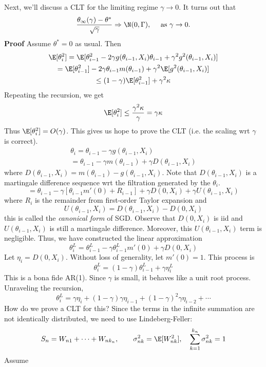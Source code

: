 Next, we'll discuss a CLT for the limiting regime \(\gamma \to 0\). It turns out that
\[\frac{\theta_\infty(\gamma) - \theta^*}{\sqrt \gamma} \Rightarrow \N(0, \Gamma), \quad \text{ as } \gamma \to 0.\]
\textbf{Proof}
Assume \(\theta^* = 0\) as usual. Then
\[\begin{gathered}\E[\theta_i^2] = \E[\theta_{i-1}^2 - 2\gamma g(\theta_{i-1}, X_i)\theta_{i-1} + \gamma^2 g^2(\theta_{i-1}, X_i)] \\
= \E[\theta_{i-1}^2] - 2 \gamma \theta_{i-1}m(\theta_{i-1}) + \gamma^2 \E[g^2(\theta_{i-1}, X_i)] \\
\leq (1 - \gamma)\E[\theta_{i-1}^2] + \gamma^2 \kappa\end{gathered}\]
Repeating the recursion, we get
\[\E[\theta_i^2] \leq \frac{\gamma^2 \kappa}{\gamma} = \gamma \kappa\]
Thus \(\E[\theta_i^2] = O(\gamma)\). This gives us hope to prove the CLT (i.e. the scaling wrt \(\gamma\) is correct).
\[\begin{gathered}\theta_i = \theta_{i-1} - \gamma g(\theta_{i-1}, X_i) \\
= \theta_{i-1} - \gamma m(\theta_{i-1}) + \gamma D(\theta_{i-1}, X_i)\end{gathered}\]
where \(D(\theta_{i-1}, X_i) = m(\theta_{i-1}) - g(\theta_{i-1}, X_i)\). Note that \(D(\theta_{i-1}, X_i)\) is a martingale difference sequence wrt the filtration generated by the \(\theta_i\).
\[= \theta_{i-1} - \gamma[\theta_{i-1}m'(0) + R_{i-1}] + \gamma D(0, X_i) + \gamma U(\theta_{i-1}, X_i)\]
where \(R_i\) is the remainder from first-order Taylor expansion and
\[U(\theta_{i-1}, X_i) = D(\theta_{i-1}, X_i) - D(0, X_i)\]
this is called the \emph{canonical form} of SGD. Observe that \(D(0, X_i)\) is iid and \(U(\theta_{i-1}, X_i)\) is still a martingale difference. Moreover, this \(U(\theta_{i-1}, X_i)\) term is negligible. Thus, we have constructed the linear approximation
\[\theta_i^L = \theta_{i-1}^L - \gamma \theta_{i-1}^L m'(0) + \gamma D(0, X_i)\]
Let \(\eta_i = D(0, X_i)\). Without loss of generality, let \(m'(0) = 1\). This process is
\[\theta_i^L = (1 - \gamma)\theta_{i-1}^L + \gamma \eta_i^L\]
This is a bona fide AR(1). Since \(\gamma\) is small, it behaves like a unit root process. Unraveling the recursion,
\[\theta_i^L = \gamma \eta_i + (1 - \gamma) \gamma \eta_{i-1} + (1 - \gamma)^2 \gamma \eta_{i-2} + \cdots\]
How do we prove a CLT for this? Since the terms in the infinite summation are not identically distributed, we need to use Lindeberg-Feller:
\[S_n = W_{n1} + \cdots + W_{nk_n}, \qquad \sigma^2_{nk} = \E[W_{nk}^2], \quad \sum_{k=1}^{k_n} \sigma_{nk}^2 = 1\]
Assume

